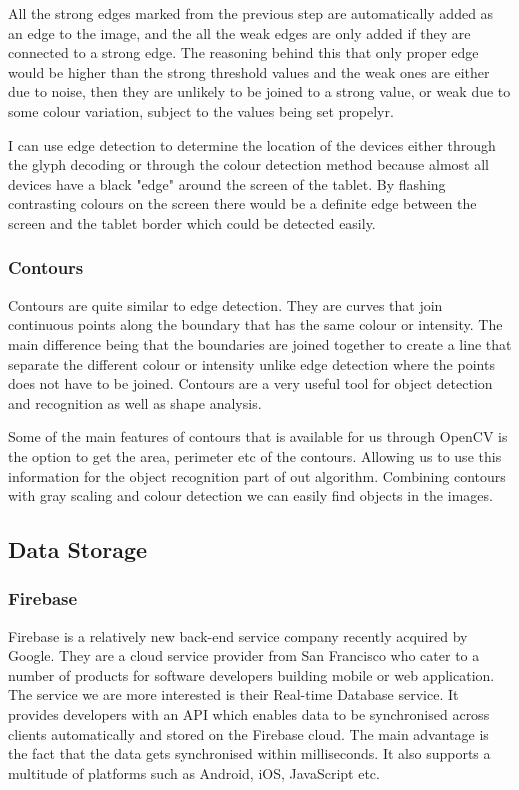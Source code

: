 \begin{enumerate}
All the strong edges marked from the previous step are automatically added as an edge to the image, and the all the weak edges are only added if they are connected to a strong edge. The reasoning behind this that only proper edge would be higher than the strong threshold values and the weak ones are either due to noise, then they are unlikely to be joined to a strong value, or weak due to some colour variation, subject to the values being set propelyr.
\end{enumerate}

I can use edge detection to determine the location of the devices either through the glyph decoding or through the colour detection method because almost all devices have a black "edge" around the screen of the tablet. By flashing contrasting colours on the screen there would be a definite edge between the screen and the tablet border which could be detected easily.
\subsubsection{Contours}
Contours are quite similar to edge detection. They are curves that join continuous points along the boundary that has the same colour or intensity\cite{contour-opencv}. The main difference being that the boundaries are joined together to create a line that separate the different colour or intensity unlike edge detection where the points does not have to be joined. Contours are a very useful tool for object detection and recognition as well as shape analysis.

Some of the main features of contours that is available for us through OpenCV is the option to get the area, perimeter etc of the contours\cite{contour-features}. Allowing us to use this information for the object recognition part of out algorithm. Combining contours with gray scaling and colour detection we can easily find objects in the images.




\subsection{Data Storage}
\subsubsection{Firebase}

Firebase\cite{firebase} is a relatively new back-end service
company recently acquired by Google. They are a cloud service provider
from San Francisco who cater to a number of products for software developers
building mobile or web application. The service we are more interested
is their Real-time Database service. It provides developers with an
API which enables data to be synchronised across clients automatically
and stored on the Firebase cloud. The main advantage is the fact that
the data gets synchronised within milliseconds. It also supports a
multitude of platforms such as Android, iOS, JavaScript etc.
 
